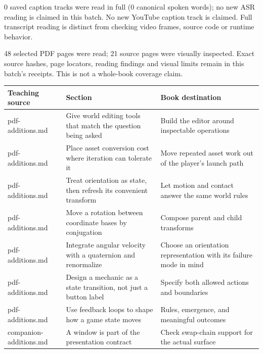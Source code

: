 0 saved caption tracks were read in full (0 canonical spoken words); no new ASR reading is claimed in this batch. No new YouTube caption track is claimed. Full transcript reading is distinct from checking video frames, source code or runtime behavior.

48 selected PDF pages were read; 21 source pages were visually inspected. Exact source hashes, page locators, reading findings and visual limits remain in this batch's receipts. This is not a whole-book coverage claim.

{\def\LTcaptype{none} %
\begin{longtable}[]{@{}
  >{\raggedright\arraybackslash}p{}
  >{\raggedright\arraybackslash}p{}
  >{\raggedright\arraybackslash}p{}@{}}
\toprule\noalign{}
\begin{minipage}[b]{\linewidth}\raggedright
Teaching source
\end{minipage} & \begin{minipage}[b]{\linewidth}\raggedright
Section
\end{minipage} & \begin{minipage}[b]{\linewidth}\raggedright
Book destination
\end{minipage} \\
\midrule\noalign{}
\endhead
\bottomrule\noalign{}
\endlastfoot
pdf-additions.md & Give world editing tools that match the question being asked & Build the editor around inspectable operations \\
pdf-additions.md & Place asset conversion cost where iteration can tolerate it & Move repeated asset work out of the player's launch path \\
pdf-additions.md & Treat orientation as state, then refresh its convenient transform & Let motion and contact answer the same world rules \\
pdf-additions.md & Move a rotation between coordinate bases by conjugation & Compose parent and child transforms \\
pdf-additions.md & Integrate angular velocity with a quaternion and renormalize & Choose an orientation representation with its failure mode in mind \\
pdf-additions.md & Design a mechanic as a state transition, not just a button label & Specify both allowed actions and boundaries \\
pdf-additions.md & Use feedback loops to shape how a game state moves & Rules, emergence, and meaningful outcomes \\
companion-additions.md & A window is part of the presentation contract & Check swap-chain support for the actual surface \\
\end{longtable}
}

